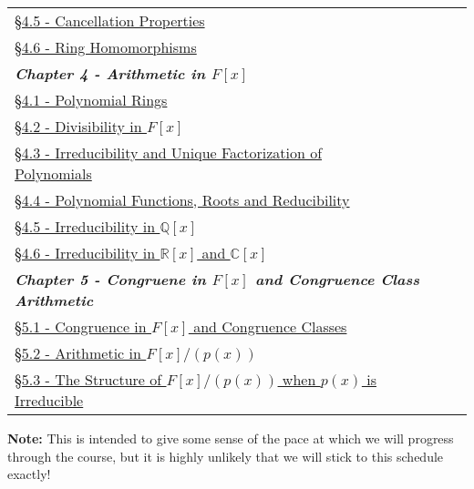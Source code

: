 \documentclass{article}
\newcommand{\chaptercolor}{RoyalBlue!35}
\begin{document}
\begin{center}
\begin{tabular}{|l|l|l|l|l|}
\href{}{\S4.5 - Cancellation Properties} & & & \\
\href{}{\S4.6 - Ring Homomorphisms} & & & \\
\hline
\multicolumn{4}{|l|}{\cellcolor{\chaptercolor} \textit{\textbf{Chapter 4 - Arithmetic in $F[x]$}}}\\
\hline
\href{}{\S4.1 - Polynomial Rings} & & & \\
\href{}{\S4.2 - Divisibility in $F[x]$} & & & \\
\href{}{\S4.3 - Irreducibility and Unique Factorization of Polynomials} & & & \\
\href{}{\S4.4 - Polynomial Functions, Roots and Reducibility} & & & \\
\href{}{\S4.5 - Irreducibility in $\mathbb{Q}[x]$} & & & \\
\href{}{\S4.6 - Irreducibility in $\mathbb{R}[x]$ and $\mathbb{C}[x]$} & & & \\
\hline
\multicolumn{4}{|l|}{\cellcolor{\chaptercolor} \textit{\textbf{Chapter 5 - Congruene in $F[x]$ and Congruence Class Arithmetic}}}\\
\hline
\href{}{\S5.1 - Congruence in $F[x]$ and Congruence Classes} & & & \\
\href{}{\S5.2 - Arithmetic in $F[x]/(p(x))$} & & & \\
\href{}{\S5.3 - The Structure of $F[x]/(p(x))$ when $p(x)$ is Irreducible} & & & \\
\hline
\end{tabular}
\end{center}
\noindent \textbf{Note:} This is intended to give some sense of the pace at which we will progress through the course, but it is highly unlikely that we will stick to this schedule exactly!
\end{document}
